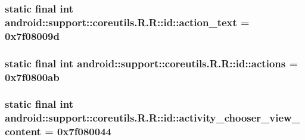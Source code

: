 \hypertarget{classandroid_1_1support_1_1coreutils_1_1_r_1_1id_793870f3f8ec635223001cfbdb06cf87}{
\subsubsection[{action\_\-text}]{\setlength{\rightskip}{0pt plus 5cm}static final int android::support::coreutils.R.R::id::action\_\-text = 0x7f08009d}}
\label{classandroid_1_1support_1_1coreutils_1_1_r_1_1id_793870f3f8ec635223001cfbdb06cf87}


\hypertarget{classandroid_1_1support_1_1coreutils_1_1_r_1_1id_19aba0b9891da82416c05751eedef92d}{
\subsubsection[{actions}]{\setlength{\rightskip}{0pt plus 5cm}static final int android::support::coreutils.R.R::id::actions = 0x7f0800ab}}
\label{classandroid_1_1support_1_1coreutils_1_1_r_1_1id_19aba0b9891da82416c05751eedef92d}


\hypertarget{classandroid_1_1support_1_1coreutils_1_1_r_1_1id_bcd45a20d4f7639fcd487f8ceb064ffe}{
\subsubsection[{activity\_\-chooser\_\-view\_\-content}]{\setlength{\rightskip}{0pt plus 5cm}static final int android::support::coreutils.R.R::id::activity\_\-chooser\_\-view\_\-content = 0x7f080044}}
\label{classandroid_1_1support_1_1coreutils_1_1_r_1_1id_bcd45a20d4f7639fcd487f8ceb064ffe}


